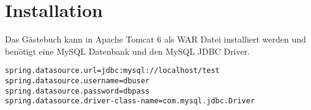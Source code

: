 \section{Installation}

Das Gästebuch kann in Apache Tomcat 6 als WAR Datei installiert werden
und benötigt eine MySQL Datenbank und den MySQL JDBC Driver.

\begin{lstlisting}[style=numbers,title=application.properties]
spring.datasource.url=jdbc:mysql://localhost/test
spring.datasource.username=dbuser
spring.datasource.password=dbpass
spring.datasource.driver-class-name=com.mysql.jdbc.Driver
\end{lstlisting}

